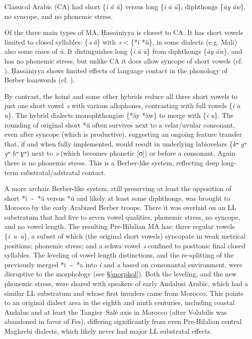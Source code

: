 \documentclass[output=paper]{langsci/langscibook}
\begin{document}
Classical Arabic (CA) had short \{\textit{ĭ} \textit{ă} \textit{ŭ}\} versus long \{\textit{ī} \textit{ā} \textit{ū}\}, diphthongs \{\textit{ăy} \textit{ăw}\}, no syncope, and no phonemic stress. 

Of the three main types of MA, Ḥassāniyya is closest to CA. It has short vowels limited to closed syllables: \{\textit{ə} \textit{ă}\} with \textit{ə} < \{*ĭ *ŭ\}, in some dialects (e.g. Mali) also some cases of \textit{ŭ}. It distinguishes long \{\textit{ī} \textit{ā} \textit{ū}\} from diphthongs \{\textit{ăy} \textit{ăw}\}, and has no phonemic stress, but unlike CA it does allow syncope of short vowels (cf. \citealt{Taine-Cheikh1988}). Ḥassāniyya shows limited effects of language contact in the phonology of Berber loanwords (cf. \citealt{Taine-Cheikh1997}).

By contrast, the koiné and some other hybrids reduce all three short vowels to just one short vowel \textit{ə} with various allophones, contrasting with full vowels \{\textit{i} \textit{a} \textit{u}\}. The hybrid dialects monophthongize \{*ăy *ăw\} to merge with \{\textit{i} \textit{u}\}. The rounding of original short *ŭ often survives next to a velar/uvular consonant, even after syncope (which is productive), suggesting an ongoing feature transfer that, if and when fully implemented, would result in underlying labiovelars \{\textit{kʷ} \textit{gʷ} \textit{qʷ} \textit{ḫʷ} \textit{ɣʷ}) next to \textit{ə} (which becomes phonetic [ʊ]) or before a consonant. Again there is no phonemic stress. This is a Berber-like system, reflecting deep long-term substratal/adstratal contact.

A more archaic Berber-like system, still preserving at least the opposition of short *ĭ~{\textasciitilde}~*ă versus *ŭ and likely at least some diphthongs, was brought to Morocco by the early Arabized Berber troops. There it was overlaid on an LL substratum that had five to seven vowel qualities, phonemic stress, no syncope, and no vowel length. The resulting Pre-Hilalian MA has: three regular vowels \{\textit{i~a~u}\}, a subset of which (the original short vowels) syncopate in weak metrical positions; phonemic stress; and a schwa vowel \textit{ə} confined to posttonic final closed syllables. The leveling of vowel length distinctions, and the re-splitting of the previously merged *i~{\textasciitilde}~*a into \textit{i} and \textit{a} based on consonantal environment, were disruptive to the morphology (see §\ref{morphol}). Both the leveling, and the new phonemic stress, were shared with speakers of early Andalusi Arabic, which had a similar LL substratum and whose first invaders came from Morocco. This points to an original dialect area in the eighth and ninth centuries, including coastal Andalus and at least the Tangier–Salé axis in Morocco (after Volubilis was abandoned in favor of Fes), differing significantly from even Pre-Hilalian central Maghrebi dialects, which likely never had major LL substratal effects. 
\end{document}
